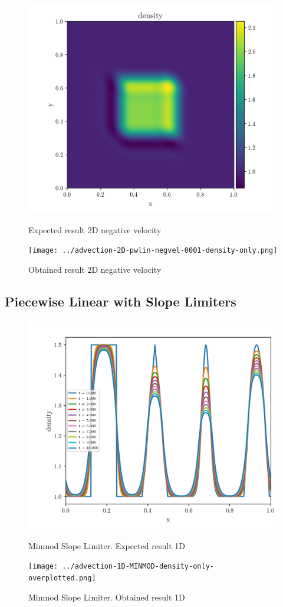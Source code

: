 \begin{figure}[htbp]
    \centering
	\includegraphics[width=.7\textwidth]{./figures/advection-2D-pwlin-negvel-0001-density-only.png}%
	\caption{Expected result 2D negative velocity}
	\texttt{[image: ../advection-2D-pwlin-negvel-0001-density-only.png]}%
	\caption{Obtained result 2D negative velocity}
\end{figure}




\clearpage
\subsection{Piecewise Linear with Slope Limiters}

\begin{figure}[htbp]
    \centering
	\includegraphics[width=.7\textwidth]{./figures/advection-1D-MINMOD-density-only-overplotted.png}%
	\caption{Minmod Slope Limiter. Expected result 1D}
	\texttt{[image: ../advection-1D-MINMOD-density-only-overplotted.png]}%
	\caption{Minmod Slope Limiter. Obtained result 1D}
\end{figure}

